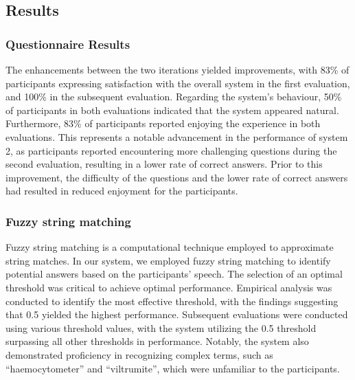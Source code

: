 \documentclass[hidelinks, 11pt]{article}
\begin{document}
\subsection{Results}
\label{subsec:results}

\subsubsection{Questionnaire Results}
The enhancements between the two iterations yielded improvements, with 83\% of participants expressing satisfaction with the overall system in the first evaluation, and 100\% in the subsequent evaluation. Regarding the system's behaviour, 50\% of participants in both evaluations indicated that the system appeared natural. Furthermore, 83\% of participants reported enjoying the experience in both evaluations. This represents a notable advancement in the performance of system 2, as participants reported encountering more challenging questions during the second evaluation, resulting in a lower rate of correct answers. Prior to this improvement, the difficulty of the questions and the lower rate of correct answers had resulted in reduced enjoyment for the participants.

\subsubsection{Fuzzy string matching}
\label{subsec:fuzzy_string}
Fuzzy string matching is a computational technique employed to approximate string matches. In our system, we employed fuzzy string matching to identify potential answers based on the participants' speech. The selection of an optimal threshold was critical to achieve optimal performance. Empirical analysis was conducted to identify the most effective threshold, with the findings suggesting that 0.5 yielded the highest performance. Subsequent evaluations were conducted using various threshold values, with the system utilizing the 0.5 threshold surpassing all other thresholds in performance. Notably, the system also demonstrated proficiency in recognizing complex terms, such as ``haemocytometer'' and ``viltrumite'', which were unfamiliar to the participants.
\end{document}
